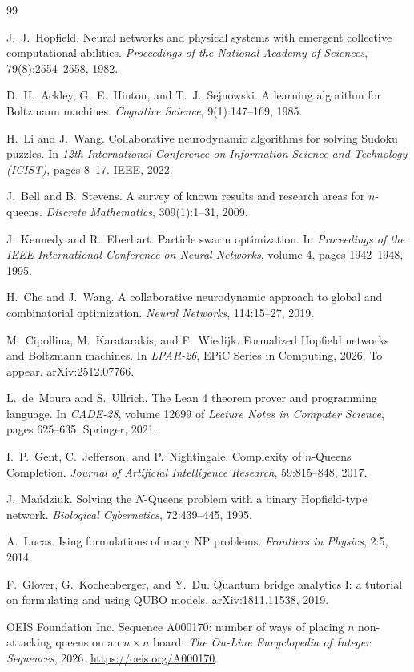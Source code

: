 \documentclass{easychair}
\begin{document}
\begin{thebibliography}{99}

J.~J.~Hopfield.
\newblock Neural networks and physical systems with emergent collective computational abilities.
\newblock \emph{Proceedings of the National Academy of Sciences}, 79(8):2554--2558, 1982.

D.~H.~Ackley, G.~E.~Hinton, and T.~J.~Sejnowski.
\newblock A learning algorithm for Boltzmann machines.
\newblock \emph{Cognitive Science}, 9(1):147--169, 1985.

H.~Li and J.~Wang.
\newblock Collaborative neurodynamic algorithms for solving Sudoku puzzles.
\newblock In \emph{12th International Conference on Information Science and Technology (ICIST)},
pages 8--17. IEEE, 2022.

J.~Bell and B.~Stevens.
\newblock A survey of known results and research areas for $n$-queens.
\newblock \emph{Discrete Mathematics}, 309(1):1--31, 2009.

J.~Kennedy and R.~Eberhart.
\newblock Particle swarm optimization.
\newblock In \emph{Proceedings of the IEEE International Conference on Neural Networks}, volume 4,
pages 1942--1948, 1995.

H.~Che and J.~Wang.
\newblock A collaborative neurodynamic approach to global and combinatorial optimization.
\newblock \emph{Neural Networks}, 114:15--27, 2019.

M.~Cipollina, M.~Karatarakis, and F.~Wiedijk.
\newblock Formalized Hopfield networks and Boltzmann machines.
\newblock In \emph{LPAR-26}, EPiC Series in Computing, 2026. To appear. arXiv:2512.07766.

L.~de~Moura and S.~Ullrich.
\newblock The Lean 4 theorem prover and programming language.
\newblock In \emph{CADE-28}, volume 12699 of \emph{Lecture Notes in Computer Science}, pages
625--635. Springer, 2021.

I.~P.~Gent, C.~Jefferson, and P.~Nightingale.
\newblock Complexity of $n$-Queens Completion.
\newblock \emph{Journal of Artificial Intelligence Research}, 59:815--848, 2017.

J.~Ma\'{n}dziuk.
\newblock Solving the $N$-Queens problem with a binary Hopfield-type network.
\newblock \emph{Biological Cybernetics}, 72:439--445, 1995.

A.~Lucas.
\newblock Ising formulations of many NP problems.
\newblock \emph{Frontiers in Physics}, 2:5, 2014.

F.~Glover, G.~Kochenberger, and Y.~Du.
\newblock Quantum bridge analytics I: a tutorial on formulating and using QUBO models.
\newblock arXiv:1811.11538, 2019.

OEIS Foundation Inc.
\newblock Sequence A000170: number of ways of placing $n$ non-attacking queens on an
$n \times n$ board.
\newblock \emph{The On-Line Encyclopedia of Integer Sequences}, 2026.
\url{https://oeis.org/A000170}.

\end{thebibliography}
\end{document}
